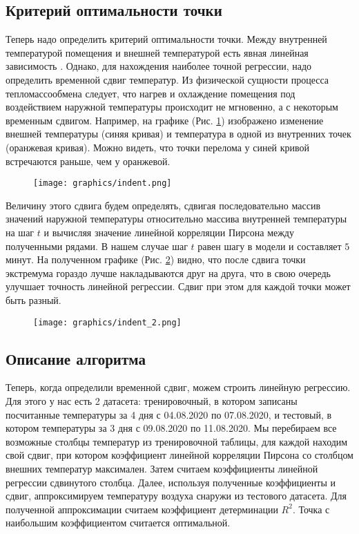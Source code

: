 \newpage


\subsection{Критерий оптимальности точки}
\label{algo-2}

Теперь надо определить критерий оптимальности точки. Между внутренней температурой помещения и внешней температурой есть явная линейная зависимость \cite{pashchenko-rassadin}. Однако, для нахождения наиболее точной регрессии, надо определить временной сдвиг температур. Из физической сущности процесса тепломассообмена следует, что нагрев и охлаждение помещения под воздействием наружной температуры происходит не мгновенно, а с некоторым временным сдвигом. Например, на графике (Рис. \ref{indent1}) изображено изменение внешней температуры (синяя кривая) и температура в одной из внутренних точек (оранжевая кривая). Можно видеть, что точки перелома у синей кривой встречаются раньше, чем у оранжевой.

\begin{figure}[H]
\centering
\texttt{[image: graphics/indent.png]}
\caption{}
\label{indent1}
\end{figure}

\newpage

Величину этого сдвига будем определять, сдвигая последовательно массив значений наружной температуры относительно массива внутренней температуры на шаг $t$ и вычисляя значение линейной корреляции Пирсона \cite{pearson} между полученными рядами. В нашем случае шаг $t$ равен шагу в модели и составляет $5$ минут. На полученном графике (Рис. \ref{indent2}) видно, что после сдвига точки экстремума гораздо лучше накладываются друг на друга, что в свою очередь улучшает точность линейной регрессии. Сдвиг при этом для каждой точки может быть разный.

\begin{figure}[H]
\centering
\texttt{[image: graphics/indent\_2.png]}
\caption{}
\label{indent2}
\end{figure}

\newpage 


\subsection{Описание алгоритма}

Теперь, когда определили временной сдвиг, можем строить линейную регрессию. Для этого у нас есть 2 датасета: тренировочный, в котором записаны посчитанные температуры за 4 дня с 04.08.2020 по 07.08.2020, и тестовый, в котором температуры за 3 дня с 09.08.2020 по 11.08.2020. Мы перебираем все возможные столбцы температур из тренировочной таблицы, для каждой находим свой сдвиг, при котором коэффициент линейной корреляции Пирсона со столбцом внешних температур максимален. Затем считаем коэффициенты линейной регрессии сдвинутого столбца. Далее, используя полученные коэффициенты и сдвиг, аппроксимируем температуру воздуха снаружи из тестового датасета. Для полученной аппроксимации считаем коэффициент детерминации $R^2$. Точка с наибольшим коэффициентом считается оптимальной.

